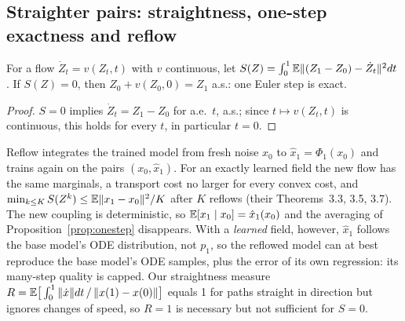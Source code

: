 \subsection{Straighter pairs: straightness, one-step exactness and reflow}\label{sec:reflow}
\begin{proposition}\label{prop:straight}
For a flow $\dot Z_t=v(Z_t,t)$ with $v$ continuous, let $S(Z)=\int_0^1\mathbb{E}\|(Z_1-Z_0)-\dot Z_t\|^2dt$ \citep{liu2023rf}. If $S(Z)=0$, then $Z_0+v(Z_0,0)=Z_1$ a.s.: one Euler step is exact.
\end{proposition}
\begin{proof}
$S=0$ implies $\dot Z_t=Z_1-Z_0$ for a.e.\ $t$, a.s.; since $t\mapsto v(Z_t,t)$ is continuous, this holds for every $t$, in particular $t=0$.
\end{proof}
Reflow \citep{liu2023rf} integrates the trained model from fresh noise $x_0$ to $\hat x_1=\Phi_1(x_0)$ and trains again on the pairs $(x_0,\hat x_1)$. For an exactly learned field the new flow has the same marginals, a transport cost no larger for every convex cost, and $\min_{k\le K}S(Z^k)\le\mathbb{E}\|x_1-x_0\|^2/K$ after $K$ reflows (their Theorems~3.3, 3.5, 3.7). The new coupling is deterministic, so $\mathbb{E}[x_1\mid x_0]=\hat x_1(x_0)$ and the averaging of Proposition~\ref{prop:onestep} disappears. With a \emph{learned} field, however, $\hat x_1$ follows the base model's ODE distribution, not $p_1$, so the reflowed model can at best reproduce the base model's ODE samples, plus the error of its own regression: its many-step quality is capped. Our straightness measure $R=\mathbb{E}\big[\int_0^1\|\dot x\|dt\,/\,\|x(1)-x(0)\|\big]$ equals 1 for paths straight in direction but ignores changes of speed, so $R=1$ is necessary but not sufficient for $S=0$.

